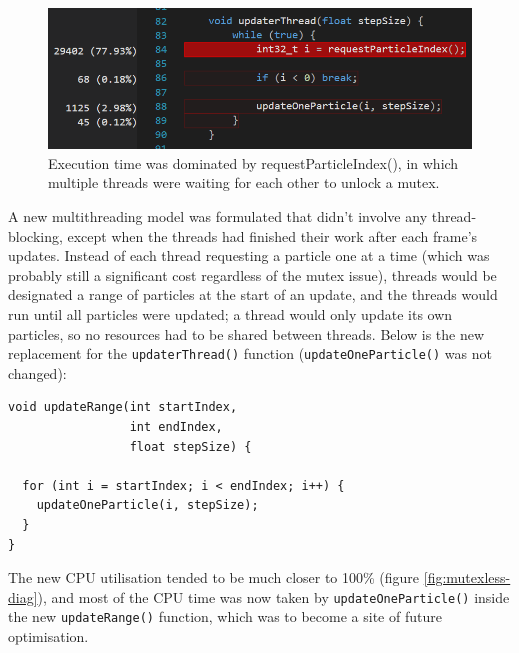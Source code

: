 \documentclass[11pt, a4paper, twocolumn]{article}
\begin{document}
\begin{figure}[h]
\includegraphics[width=\linewidth]{updaterthread-request}
\caption{Execution time was dominated by requestParticleIndex(), in which multiple threads were waiting for each other to unlock a mutex.}
\label{fig:updaterthread-request}
\end{figure}

A new multithreading model was formulated that didn't involve any thread-blocking, except when the threads had finished their work after each frame's updates. Instead of each thread requesting a particle one at a time (which was probably still a significant cost regardless of the mutex issue), threads would be designated a range of particles at the start of an update, and the threads would run until all particles were updated; a thread would only update its own particles, so no resources had to be shared between threads. Below is the new replacement for the \verb|updaterThread()| function (\verb|updateOneParticle()| was not changed):

\begin{verbatim}
void updateRange(int startIndex,
                 int endIndex,
                 float stepSize) {
  
  for (int i = startIndex; i < endIndex; i++) {
    updateOneParticle(i, stepSize);
  }
}
\end{verbatim}

The new CPU utilisation tended to be much closer to 100\% (figure \ref{fig:mutexless-diag}), and most of the CPU time was now taken by \verb|updateOneParticle()| inside the new \verb|updateRange()| function, which was to become a site of future optimisation.
\end{document}
